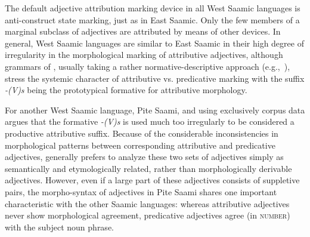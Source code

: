 The default adjective attribution marking device in all West Saamic languages is anti\hyp{}construct state marking, just as in East Saamic. Only the few members of a marginal subclass of adjectives are attributed by means of other devices. In general, West Saamic languages are similar to East Saamic in their high degree of irregularity in the morphological marking of attributive adjectives, although grammars of , usually taking a rather normative-descriptive approach (e.g.,~\citealt{nickel1990,sammallahti1998b,svonni2009a}), stress the systemic character of attributive vs. predicative marking with the suffix \textit{-(V)s} being the prototypical  formative for attributive morphology.

For another West Saamic language, Pite Saami, and using exclusively corpus data \citet[128–129]{wilbur2014a} argues that the formative \textit{-(V)s} is used much too irregularly to be considered a productive attributive suffix. Because of the considerable inconsistencies in morphological patterns between corresponding attributive and predicative adjectives, \cite[134]{wilbur2014a} generally prefers to analyze these two sets of adjectives simply as semantically and etymologically related, rather than morphologically derivable adjectives. However, even if a large part of these adjectives consists of suppletive pairs, the morpho-syntax of adjectives in Pite Saami shares one important characteristic with the other Saamic languages: whereas attributive adjectives never show morphological agreement, predicative adjectives agree (in \textsc{number}) with the subject noun phrase.


